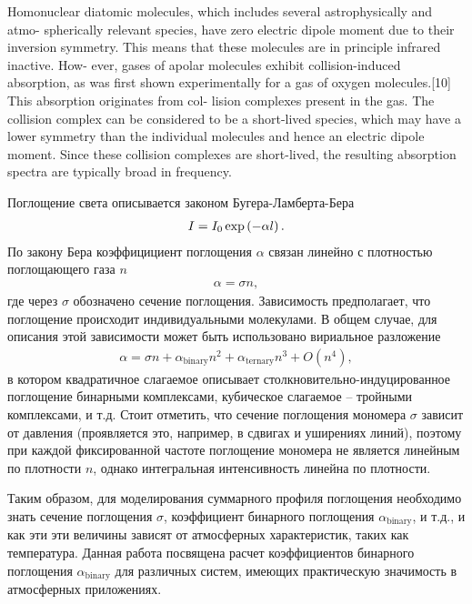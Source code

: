 \iffalse
Homonuclear diatomic molecules, which includes several astrophysically and atmo-
spherically relevant species, have zero electric dipole moment due to their inversion
symmetry. This means that these molecules are in principle infrared inactive. How-
ever, gases of apolar molecules exhibit collision-induced absorption, as was first shown
experimentally for a gas of oxygen molecules.[10] This absorption originates from col-
lision complexes present in the gas. The collision complex can be considered to be a
short-lived species, which may have a lower symmetry than the individual molecules
and hence an electric dipole moment. Since these collision complexes are short-lived,
the resulting absorption spectra are typically broad in frequency.

Поглощение света описывается законом Бугера-Ламберта-Бера 
\begin{gather}
    I = I_0 \exp \left( - \alpha l \right). 
\end{gather}
По закону Бера коэффицициент поглощения $\alpha$ связан линейно с плотностью поглощающего газа $n$
\begin{gather}
    \alpha = \sigma n,
\end{gather}
где через $\sigma$ обозначено сечение поглощения. Зависимость предполагает, что поглощение происходит индивидуальными молекулами. В общем случае, для описания этой зависимости может быть использовано вириальное разложение
\begin{gather}
    \alpha = \sigma n + \alpha_\text{binary} n^2 + \alpha_\text{ternary} n^3 + O(n^4), 
\end{gather}
в котором квадратичное слагаемое описывает столкновительно-индуцированное поглощение бинарными комплексами, кубическое слагаемое -- тройными комплексами, и т.д. Стоит отметить, что сечение поглощения мономера $\sigma$ зависит от давления (проявляется это, например, в сдвигах и уширениях линий), поэтому при каждой фиксированной частоте поглощение мономера не является линейным по плотности $n$, однако интегральная интенсивность линейна по плотности. \par
Таким образом, для моделирования суммарного профиля поглощения необходимо знать сечение поглощения $\sigma$, коэффициент бинарного поглощения $\alpha_\text{binary}$, и т.д., и как эти эти величины зависят от атмосферных характеристик, таких как температура. Данная работа посвящена расчет коэффициентов бинарного поглощения $\alpha_\text{binary}$ для различных систем, имеющих практическую значимость в атмосферных приложениях. \par
